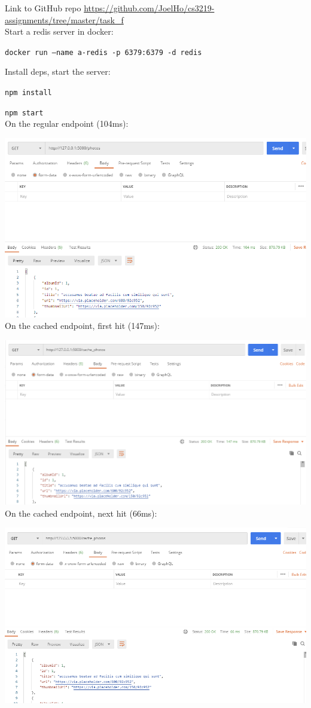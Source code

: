 \documentclass{article}
\begin{document}
    Link to GitHub repo \href{https://github.com/JoelHo/cs3219-assignments/tree/master/task_f}{https://github.com/JoelHo/cs3219-assignments/tree/master/task\_f}\\

    Start a redis server in docker:

    \texttt{docker run --name a-redis -p 6379:6379 -d redis}

    Install deps, start the server:

    \texttt{npm install}

    \texttt{npm start}\\

    On the regular endpoint (104ms):

    \includegraphics[width=\textwidth]{img/uncache.png}\\

    \pagebreak
    On the cached endpoint, first hit (147ms):

    \includegraphics[width=\textwidth]{img/setcache.png}\\

    On the cached endpoint, next hit (66ms):

    \includegraphics[width=\textwidth]{img/getcache.png}\\
\end{document}
